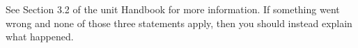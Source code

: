 \documentclass[ oneside,%
                    author={Joshua Felmeden},
                    degree={MEng},
                     title={Semantic Analysis of Financial Headlines Based on Realised Stock Returns},
                  subtitle={}]{dissertation}
\begin{document}
See Section 3.2 of the unit Handbook for more information. If something went wrong and none of those three statements apply, then you should instead explain what happened.







\end{document}
